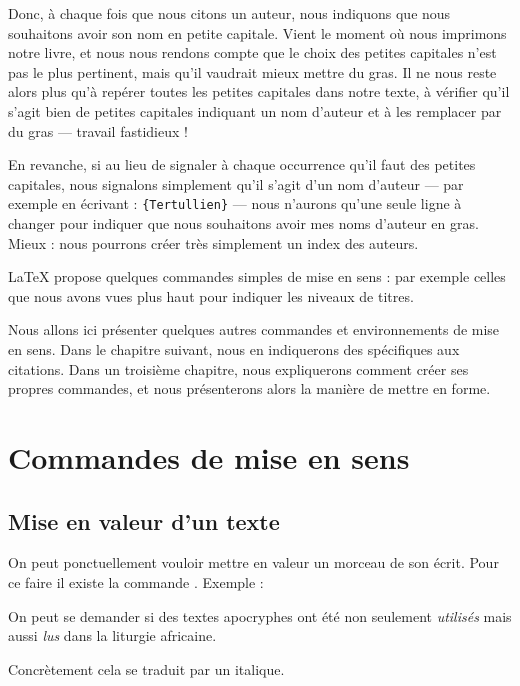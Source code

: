 Donc, à chaque fois que nous citons un auteur, nous indiquons que nous souhaitons avoir son nom en petite capitale.
Vient le moment où nous imprimons notre livre, et nous nous rendons compte que le choix des petites capitales n'est pas le plus pertinent, mais qu'il vaudrait mieux mettre du gras. Il ne nous reste alors plus qu'à repérer toutes les petites capitales dans notre texte, à vérifier qu'il s'agit bien de petites capitales indiquant un nom d'auteur et à les remplacer par du gras --- travail fastidieux !

En revanche, si au lieu de signaler à chaque occurrence qu'il faut des petites capitales, nous signalons simplement  qu'il s'agit d'un nom d'auteur --- par exemple en écrivant : \verb|{Tertullien}| --- nous n'aurons qu'une seule ligne à changer pour indiquer que nous souhaitons avoir mes noms d'auteur en gras. Mieux : nous pourrons créer très simplement un index des auteurs.

LaTeX propose quelques commandes simples de mise en sens  : par exemple celles que nous avons vues plus haut pour indiquer les niveaux de titres.

Nous allons ici présenter quelques autres commandes et environnements de mise en sens. Dans le chapitre suivant, nous en indiquerons des spécifiques aux citations. Dans un troisième chapitre, nous expliquerons comment créer ses propres commandes, et nous présenterons alors la manière de mettre en forme.

\section{Commandes de mise en sens}

\subsection{Mise en valeur d'un texte}

On peut ponctuellement vouloir mettre en valeur un morceau de son écrit. Pour ce faire il existe la commande .
Exemple :

\begin{latexcode}
On peut se demander si des textes apocryphes 
ont été non seulement \emph{utilisés} mais aussi \emph{lus}
dans la liturgie africaine.
\end{latexcode}

Concrètement cela se traduit par un italique. 

